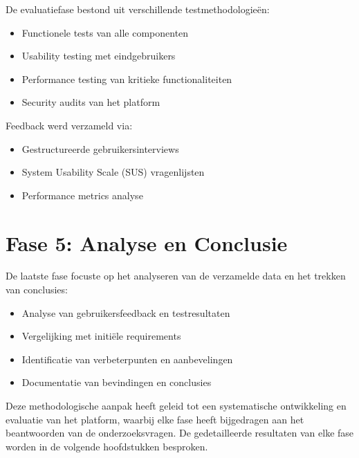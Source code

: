 De evaluatiefase bestond uit verschillende testmethodologieën:

\begin{itemize}
    \item Functionele tests van alle componenten
    \item Usability testing met eindgebruikers
    \item Performance testing van kritieke functionaliteiten
    \item Security audits van het platform
\end{itemize}

Feedback werd verzameld via:
\begin{itemize}
    \item Gestructureerde gebruikersinterviews
    \item System Usability Scale (SUS) vragenlijsten
    \item Performance metrics analyse
\end{itemize}

\section{Fase 5: Analyse en Conclusie}
\label{sec:fase5}

De laatste fase focuste op het analyseren van de verzamelde data en het trekken van conclusies:

\begin{itemize}
    \item Analyse van gebruikersfeedback en testresultaten
    \item Vergelijking met initiële requirements
    \item Identificatie van verbeterpunten en aanbevelingen
    \item Documentatie van bevindingen en conclusies
\end{itemize}

Deze methodologische aanpak heeft geleid tot een systematische ontwikkeling en evaluatie van het platform, waarbij elke fase heeft bijgedragen aan het beantwoorden van de onderzoeksvragen. De gedetailleerde resultaten van elke fase worden in de volgende hoofdstukken besproken.


